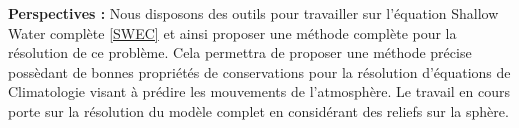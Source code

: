 \documentclass[portrait,final,a0paper,fontscale=0.34]{baposter}%
\begin{document}
\begin{poster}
{\textbf{Perspectives : } Nous disposons des outils pour travailler sur l'équation Shallow Water  complète \eqref{SWEC} et ainsi proposer une méthode complète pour la résolution de ce problème. Cela permettra de proposer une méthode précise possèdant de bonnes propriétés de conservations pour la résolution d'équations de Climatologie visant à prédire les mouvements de l'atmosphère. Le travail en cours porte sur la résolution du modèle complet en considérant des reliefs sur la sphère.
    
  }

\end{poster}
\end{document}
